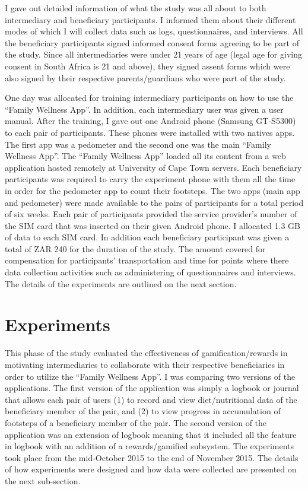 I gave out detailed information of what the study was all about to both intermediary and beneficiary participants. I informed them about their different modes of which I will collect data such as logs, questionnaires, and interviews. All the beneficiary participants signed informed consent forms agreeing to be part of the study. Since all intermediaries were under 21 years of age (legal age for giving consent in South Africa is 21 and above), they signed assent forms which were also signed by their respective parents/guardians who were part of the study.

One day was allocated for training intermediary participants on how to use the ``Family Wellness App''. In addition, each intermediary user was given a user manual. After the training, I gave out one Android phone (Samsung GT-S5300) to each pair of participants. These phones were installed with two natives apps. The first app was a pedometer and the second one was the main ``Family Wellness App''. The ``Family Wellness App'' loaded all its content from a web application hosted remotely at University of Cape Town servers. Each beneficiary participants was required to carry the experiment phone with them all the time in order for the pedometer app to count their footsteps. The two apps (main app and pedometer) were made available to the pairs of participants for a total period of six weeks. Each pair of participants provided the service provider's number of the SIM card that was inserted on their given Android phone. I allocated 1.3 GB of data to each SIM card. In addition each beneficiary participant was given a total of ZAR 240 for the duration of the study. The amount covered for compensation for participants' transportation and time for points where there data collection activities such as administering of questionnaires and interviews. The details of the experiments are outlined on the next section. 
\section{Experiments}
This phase of the study evaluated the effectiveness of gamification/rewards in motivating  intermediaries to collaborate with their respective beneficiaries in order to utilize the ``Family Wellness App''. I was comparing two versions of the applications. The first version of the application was simply a logbook or journal that allows each pair of users (1) to record and view diet/nutritional data of the beneficiary member of the pair, and (2) to view progress in accumulation of footsteps of a beneficiary member of the pair. The second version of the application was an extension of logbook meaning that it included all the feature in logbook  with an addition of a rewards/gamified subsystem. The experiments took place from the mid-October 2015 to the end of November 2015.  The details of how experiments were designed and how data were collected are presented on the next sub-section.
